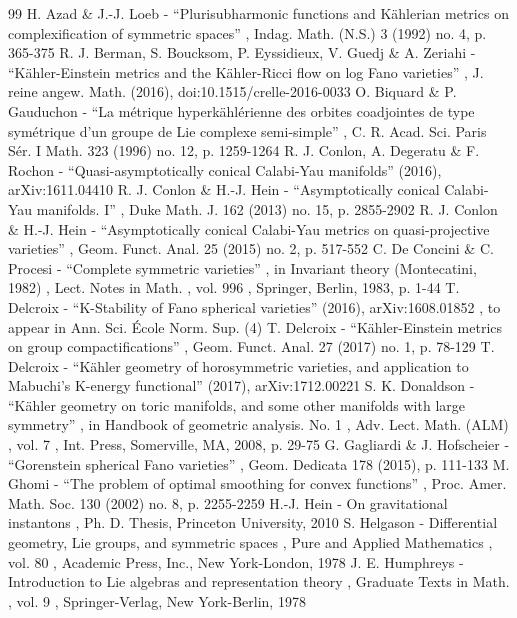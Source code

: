 \documentclass[10pt]{amsart}
\theoremstyle{plain}
\theoremstyle{definition}
\begin{document}
\begin{thebibliography}{99}
 H. Azad \& J.-J. Loeb - “Plurisubharmonic functions and Kählerian metrics on complexification of symmetric spaces” , Indag. Math. (N.S.) 3 (1992) no. 4, p. 365-375
 R. J. Berman, S. Boucksom, P. Eyssidieux, V. Guedj \& A. Zeriahi - “Kähler-Einstein metrics and the Kähler-Ricci flow on log Fano varieties” , J. reine angew. Math. (2016), doi:10.1515/crelle-2016-0033
 O. Biquard \& P. Gauduchon - “La métrique hyperkählérienne des orbites coadjointes de type symétrique d’un groupe de Lie complexe semi-simple” , C. R. Acad. Sci. Paris Sér. I Math. 323 (1996) no. 12, p. 1259-1264
 R. J. Conlon, A. Degeratu \& F. Rochon - “Quasi-asymptotically conical Calabi-Yau manifolds” (2016), arXiv:1611.04410
 R. J. Conlon \& H.-J. Hein - “Asymptotically conical Calabi-Yau manifolds. I” , Duke Math. J. 162 (2013) no. 15, p. 2855-2902
 R. J. Conlon \& H.-J. Hein - “Asymptotically conical Calabi-Yau metrics on quasi-projective varieties” , Geom. Funct. Anal. 25 (2015) no. 2, p. 517-552
 C. De Concini \& C. Procesi - “Complete symmetric varieties” , in Invariant theory (Montecatini, 1982) , Lect. Notes in Math. , vol. 996 , Springer, Berlin, 1983, p. 1-44
 T. Delcroix - “K-Stability of Fano spherical varieties” (2016), arXiv:1608.01852 , to appear in Ann. Sci. École Norm. Sup. (4)
 T. Delcroix - “Kähler-Einstein metrics on group compactifications” , Geom. Funct. Anal. 27 (2017) no. 1, p. 78-129
 T. Delcroix - “Kähler geometry of horosymmetric varieties, and application to Mabuchi’s K-energy functional” (2017), arXiv:1712.00221
 S. K. Donaldson - “Kähler geometry on toric manifolds, and some other manifolds with large symmetry” , in Handbook of geometric analysis. No. 1 , Adv. Lect. Math. (ALM) , vol. 7 , Int. Press, Somerville, MA, 2008, p. 29-75
 G. Gagliardi \& J. Hofscheier - “Gorenstein spherical Fano varieties” , Geom. Dedicata 178 (2015), p. 111-133
 M. Ghomi - “The problem of optimal smoothing for convex functions” , Proc. Amer. Math. Soc. 130 (2002) no. 8, p. 2255-2259
 H.-J. Hein - On gravitational instantons , Ph. D. Thesis, Princeton University, 2010
 S. Helgason - Differential geometry, Lie groups, and symmetric spaces , Pure and Applied Mathematics , vol. 80 , Academic Press, Inc., New York-London, 1978
 J. E. Humphreys - Introduction to Lie algebras and representation theory , Graduate Texts in Math. , vol. 9 , Springer-Verlag, New York-Berlin, 1978

\end{thebibliography}
\end{document}
